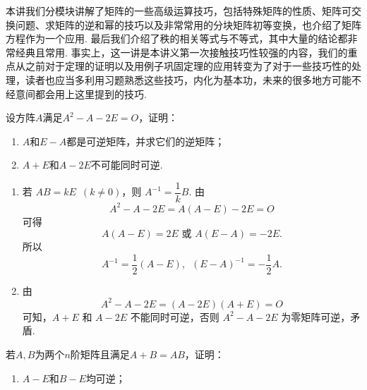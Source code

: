 \begin{summary}

    本讲我们分模块讲解了矩阵的一些高级运算技巧，包括特殊矩阵的性质、矩阵可交换问题、求矩阵的逆和幂的技巧以及非常常用的分块矩阵初等变换，也介绍了矩阵方程作为一个应用. 最后我们介绍了秩的相关等式与不等式，其中大量的结论都非常经典且常用. 事实上，这一讲是本讲义第一次接触技巧性较强的内容，我们的重点从之前对于定理的证明以及用例子巩固定理的应用转变为了对于一些技巧性的处理，读者也应当多利用习题熟悉这些技巧，内化为基本功，未来的很多地方可能不经意间都会用上这里提到的技巧.

\end{summary}

\begin{exercise}

    \begin{exgroup}
        \item 设方阵$A$满足$A^2-A-2E=O$，证明：
        \begin{enumerate}
            \item $A$和$E-A$都是可逆矩阵，并求它们的逆矩阵；

            \item $A+E$和$A-2E$不可能同时可逆.
        \end{enumerate}
        \begin{answer}
            \begin{enumerate}
                \item 若 $ AB = kE \enspace(k \neq 0) $，则 $ A^{-1} = \dfrac{1}{k} B $. 由
                      \[ A^2 - A - 2E = A(A - E) - 2E = O \]
                      可得
                      \[ A(A - E) = 2E \text{~或~} A(E - A) = -2E. \]
                      所以
                      \[ A^{-1} = \frac{1}{2}(A-E),\enspace (E - A)^{-1} = -\frac{1}{2}A. \]

                \item 由
                      \[  A^2 - A - 2E = (A - 2E)(A + E) = O \]
                      可知，$ A + E $ 和 $ A - 2E $ 不能同时可逆，否则 $ A^2 - A - 2E $ 为零矩阵可逆，矛盾.
            \end{enumerate}
        \end{answer}

        \item 若$A,B$为两个$n$阶矩阵且满足$A+B=AB$，证明：
        \begin{enumerate}
            \item $A-E$和$B-E$均可逆；


\end{enumerate}
\end{exgroup}
\end{exercise}
